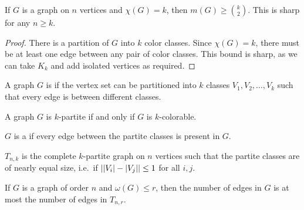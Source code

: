 
\begin{theorem}
  If $G$ is a graph on $n$ vertices and $\chi(G) = k$, then $m(G) \ge
  \binom{k}{2}$.
  This is sharp for any $n \ge k$.
\end{theorem}

\begin{proof}
  There is a partition of $G$ into $k$ color classes.
  Since $\chi(G) = k$, there must be at least one edge between any pair of color
  classes.
  This bound is sharp, as we can take $K_k$ and add isolated vertices as
  required.
\end{proof}



\begin{definition}
  A graph $G$ is  if the vertex set can be partitioned into
  $k$ classes $V_1, V_2, \ldots, V_k$ such that every edge is between different
  classes.
\end{definition}

\begin{remark}
  A graph $G$ is $k$-partite if and only if $G$ is $k$-colorable.
\end{remark}

\begin{definition}
  $G$ is a  if every edge between the partite
  classes is present in $G$.
\end{definition}

\begin{definition}
   $T_{n,k}$ is the complete $k$-partite graph on $n$
  vertices such that the partite classes are of nearly equal size, i.e.~if
  $\left| \left| V_i \right| - \left| V_j \right| \right| \le 1$ for all $i, j$.
\end{definition}

\begin{theorem}[Turàn]
  If $G$ is a graph of order $n$ and $\omega(G) \le r$, then the number of edges
  in $G$ is at most the number of edges in $T_{n,r}$.
\end{theorem}

